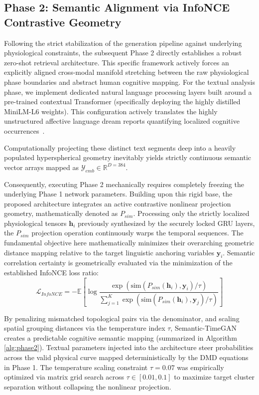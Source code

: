 \documentclass[journal]{IEEEtran}
\begin{document}
\subsection{Phase 2: Semantic Alignment via InfoNCE Contrastive Geometry}
Following the strict stabilization of the generation pipeline against underlying physiological constraints, the subsequent Phase 2 directly establishes a robust zero-shot retrieval architecture. This specific framework actively forces an explicitly aligned cross-modal manifold stretching between the raw physiological phase boundaries and abstract human cognitive mapping. For the textual analysis phase, we implement dedicated natural language processing layers built around a pre-trained contextual Transformer (specifically deploying the highly distilled MiniLM-L6 weights). This configuration actively translates the highly unstructured affective language dream reports quantifying localized cognitive occurrences~\cite{wong2023dream}. 

Computationally projecting these distinct text segments deep into a heavily populated hyperspherical geometry inevitably yields strictly continuous semantic vector arrays mapped as $\mathcal{Y}_{emb} \in \mathbb{R}^{D=384}$. 

Consequently, executing Phase 2 mechanically requires completely freezing the underlying Phase 1 network parameters. Building upon this rigid base, the proposed architecture integrates an active contrastive nonlinear projection geometry, mathematically denoted as $P_{sim}$. Processing only the strictly localized physiological tensors $\mathbf{h}_i$ previously synthesized by the securely locked GRU layers, the $P_{sim}$ projection operation continuously warps the temporal sequences. The fundamental objective here mathematically minimizes their overarching geometric distance mapping relative to the target linguistic anchoring variables $\mathbf{y}_i$. Semantic correlation certainty is geometrically evaluated via the minimization of the established InfoNCE loss ratio:
\begin{equation}
\mathcal{L}_{InfoNCE} = - \mathbb{E} \left[ \log \frac{\exp(\text{sim}(P_{sim}(\mathbf{h}_i), \mathbf{y}_i) / \tau)}{\sum_{j=1}^{K} \exp(\text{sim}(P_{sim}(\mathbf{h}_i), \mathbf{y}_j) / \tau)} \right]
\end{equation}

By penalizing mismatched topological pairs via the denominator, and scaling spatial grouping distances via the temperature index $\tau$, Semantic-TimeGAN creates a predictable cognitive semantic mapping (summarized in Algorithm \ref{alg:phase2}). Textual parameters injected into the architecture steer probabilities across the valid physical curve mapped deterministically by the DMD equations in Phase 1. The temperature scaling constraint $\tau=0.07$ was empirically optimized via matrix grid search across $\tau \in [0.01, 0.1]$ to maximize target cluster separation without collapsing the nonlinear projection.
\end{document}
